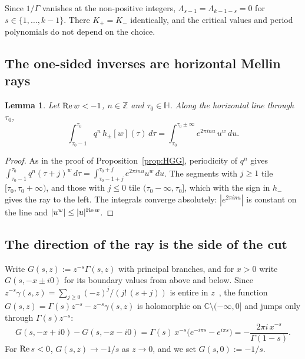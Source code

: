 \documentclass[11pt]{article}
\newtheorem{lemma}[theorem]{Lemma}
\newcommand{\HH}{\mathbb{H}}
\newcommand{\ZZ}{\mathbb{Z}}
\newcommand{\CC}{\mathbb{C}}
\begin{document}
Since $1/\Gamma$ vanishes at the non-positive integers, $\Lambda_{s-1}=\Lambda_{k-1-s}=0$ for
$s\in\{1,\dots,k-1\}$. There $K_+=K_-$ identically, and the critical values and period polynomials
do not depend on the choice.

\subsection{The one-sided inverses are horizontal Mellin rays}

\begin{lemma}\label{lem:app-unfold}
Let ${\rm Re}\,w<-1$, $n\in\ZZ$ and $\tau_0\in\HH$. Along the horizontal line through $\tau_0$,
\begin{equation}\label{eq:app-unfold}
\int_{\tau_0-1}^{\tau_0}q^n\,h_\pm[w](\tau)\,d\tau=\int_{\tau_0}^{\tau_0\pm\infty}e^{2\pi inu}\,u^{w}\,du.
\end{equation}
\end{lemma}

\begin{proof}
As in the proof of Proposition~\ref{prop:HGG}, periodicity of $q^n$ gives
$\int_{\tau_0-1}^{\tau_0}q^n(\tau+j)^w\,d\tau=\int_{\tau_0-1+j}^{\tau_0+j}e^{2\pi inu}u^w\,du$. The
segments with $j\ge1$ tile $[\tau_0,\tau_0+\infty)$, and those with $j\le0$ tile
$(\tau_0-\infty,\tau_0]$, which with the sign in $h_-$ gives the ray to the left. The integrals
converge absolutely: $|e^{2\pi inu}|$ is constant on the line and $|u^w|\le|u|^{{\rm Re}\,w}$.
\end{proof}

\subsection{The direction of the ray is the side of the cut}

Write $G(s,z):=z^{-s}\Gamma(s,z)$ with principal branches, and for $x>0$ write $G(s,-x\pm i0)$
for its boundary values from above and below. Since
$z^{-s}\gamma(s,z)=\sum_{j\ge0}(-z)^j/(j!\,(s+j))$ is entire in $z$~\cite[\S8.7]{DLMF}, the function
$G(s,z)=\Gamma(s)z^{-s}-z^{-s}\gamma(s,z)$ is holomorphic on $\CC\setminus(-\infty,0]$ and jumps only
through $\Gamma(s)z^{-s}$:
\begin{equation}\label{eq:app-jump}
G(s,-x+i0)-G(s,-x-i0)=\Gamma(s)\,x^{-s}\big(e^{-i\pi s}-e^{i\pi s}\big)=-\frac{2\pi i\,x^{-s}}{\Gamma(1-s)}.
\end{equation}
For ${\rm Re}\,s<0$, $G(s,z)\to-1/s$ as $z\to0$, and we set $G(s,0):=-1/s$.
\end{document}
